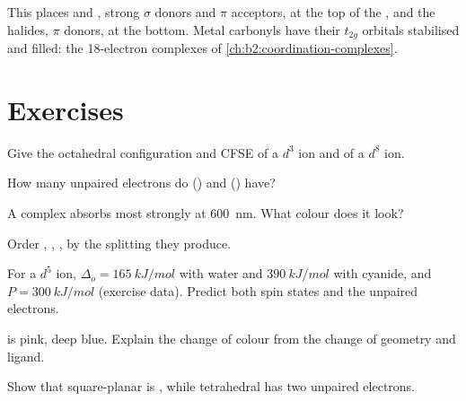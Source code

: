 This places  and , strong $\sigma$ donors and $\pi$ acceptors, at the top of the
, and the halides, $\pi$ donors, at the bottom. Metal carbonyls have
their $t_{2g}$ orbitals stabilised and filled: the 18-electron complexes of
\cref{ch:b2:coordination-complexes}.

\section{Exercises}

\begin{exercise}[$\star$]\label{exo:b2:ligand-field:1}
Give the octahedral configuration and CFSE of a $d^3$ ion and of a $d^8$ ion.
\end{exercise}

\begin{exercise}[$\star$]\label{exo:b2:ligand-field:2}
How many unpaired electrons do  () and  () have?
\end{exercise}

\begin{exercise}[$\star$]\label{exo:b2:ligand-field:3}
A complex absorbs most strongly at \qty{600}{nm}. What colour does it look?
\end{exercise}

\begin{exercise}[$\star$]\label{exo:b2:ligand-field:4}
Order , , ,  by the splitting they produce.
\end{exercise}

\begin{exercise}[$\star\star$]\label{exo:b2:ligand-field:5}
For a $d^5$ ion, $\Delta_o = \qty{165}{kJ/mol}$ with water and $\qty{390}{kJ/mol}$ with cyanide,
and $P = \qty{300}{kJ/mol}$ (exercise data). Predict both spin states and the unpaired
electrons.
\end{exercise}

\begin{exercise}[$\star\star$]\label{exo:b2:ligand-field:6}
 is pink,  deep blue. Explain the change of colour from the
change of geometry and ligand.
\end{exercise}

\begin{exercise}[$\star\star$]\label{exo:b2:ligand-field:7}
Show that square-planar  is , while tetrahedral
 has two unpaired electrons.
\end{exercise}

